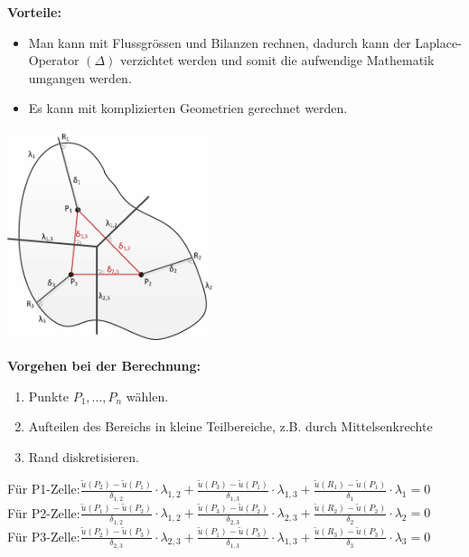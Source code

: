 \textbf{Vorteile:}\\
\begin{itemize}
\item Man kann mit Flussgrössen und Bilanzen rechnen, dadurch kann der
Laplace-Operator $(\Delta)$ verzichtet werden und somit die aufwendige Mathematik umgangen werden.
\item Es kann mit komplizierten Geometrien gerechnet werden.  
\end{itemize}

\begin{minipage}{6cm}
	\includegraphics[width=6cm]{Content/Numerik/FVM1.png}
\end{minipage}
\hfill
\begin{minipage}{12cm}
\textbf{Vorgehen bei der Berechnung:}\\
\begin{enumerate}
\item Punkte $P_1,\ldots,P_n$ wählen.
\item Aufteilen des Bereichs in kleine Teilbereiche, z.B. durch Mittelsenkrechte
\item Rand diskretisieren.\\
\end{enumerate}

Für P1-Zelle:\quad $\frac{\tilde{u}(P_2)-\tilde{u}(P_1)}{\delta_{1,2}}\cdot\lambda_{1,2}+\frac{\tilde{u}(P_3)-\tilde{u}(P_1)}{\delta_{1,3}}\cdot\lambda_{1,3}+\frac{\tilde{u}(R_1)-\tilde{u}(P_1)}{\delta_1}\cdot\lambda_1=0$\\

Für P2-Zelle:\quad $\frac{\tilde{u}(P_1)-\tilde{u}(P_2)}{\delta_{1,2}}\cdot\lambda_{1,2}+\frac{\tilde{u}(P_3)-\tilde{u}(P_2)}{\delta_{2,3}}\cdot\lambda_{2,3}+\frac{\tilde{u}(R_2)-\tilde{u}(P_2)}{\delta_2}\cdot\lambda_2=0$\\

Für P3-Zelle:\quad $\frac{\tilde{u}(P_2)-\tilde{u}(P_3)}{\delta_{2,3}}\cdot\lambda_{2,3}+\frac{\tilde{u}(P_1)-\tilde{u}(P_3)}{\delta_{1,3}}\cdot\lambda_{1,3}+\frac{\tilde{u}(R_3)-\tilde{u}(P_3)}{\delta_3}\cdot\lambda_3=0$\\
\end{minipage}


